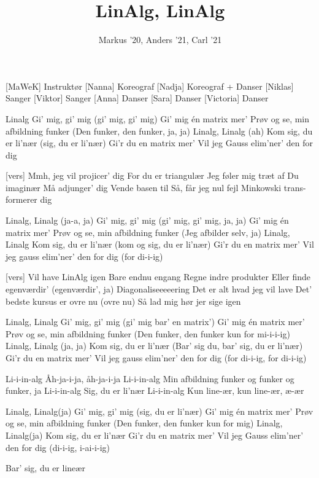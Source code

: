 \documentclass[a4paper,11pt]{article}
\title{LinAlg, LinAlg}
\author{Markus '20, Anders '21, Carl '21}
\begin{document}
\maketitle

\begin{roles}
[MaWeK] Instruktør
[Nanna] Koreograf
[Nadja] Koreograf + Danser
[Niklas] Sanger
[Viktor] Sanger
[Anna] Danser
[Sara] Danser
[Victoria] Danser
\end{roles}

\begin{props}
\end{props}


\begin{song}
 Linalg
Gi' mig, gi' mig (gi' mig, gi' mig)
Gi' mig én matrix mer'
Prøv og se, min afbildning funker
(Den funker, den funker, ja, ja)
Linalg, Linalg (ah)
Kom sig, du er li'nær (sig, du er li'nær)
Gi'r du en matrix mer'
Vil jeg Gauss elim'ner' den for dig

[vers] Mmh, jeg vil projicer' dig
For du er triangulær
Jeg føler mig træt af
Du imaginær
Må adjunger' dig
Vende basen til
Så, får jeg nul fejl
Minkowski trans-formerer dig

 Linalg, Linalg (ja-a, ja)
Gi' mig, gi' mig (gi' mig, gi' mig, ja, ja)
Gi' mig én matrix mer'
Prøv og se, min afbildning funker
(Jeg afbilder selv, ja)
Linalg, Linalg
Kom sig, du er li'nær (kom og sig, du er li'nær)
Gi'r du en matrix mer'
Vil jeg gauss elim'ner' den for dig (for di-i-ig)

[vers] Vil have LinAlg igen
Bare endnu engang
Regne indre produkter
Eller finde egenværdir' (egenværdir', ja)
Diagonaliseeeeering
Det er alt hvad jeg vil lave
Det' bedste kursus er ovre nu (ovre nu)
Så lad mig hør jer sige igen

 Linalg, Linalg
Gi' mig, gi' mig (gi' mig bar' en matrix')
Gi' mig én matrix mer'
Prøv og se, min afbildning funker
(Den funker, den funker kun for mi-i-i-ig)
Linalg, Linalg (ja, ja)
Kom sig, du er li'nær
(Bar' sig du, bar' sig, du er li'nær)
Gi'r du en matrix mer'
Vil jeg gauss elim'ner' den for dig (for di-i-ig, for di-i-ig)

 Li-i-in-alg
Åh-ja-i-ja, åh-ja-i-ja
Li-i-in-alg
Min afbildning funker og funker og funker, ja
Li-i-in-alg
Sig, du er li'nær
Li-i-in-alg
Kun line-ær, kun line-ær, æ-ær

 Linalg, Linalg(ja)
Gi' mig, gi' mig (sig, du er li'nær)
Gi' mig én matrix mer'
Prøv og se, min afbildning funker
(Den funker, den funker kun for mig)
Linalg, Linalg(ja)
Kom sig, du er li'nær
Gi'r du en matrix mer'
Vil jeg Gauss elim'ner' den for dig (di-i-ig, i-ai-i-ig)

Bar' sig, du er lineær
\end{song}
\end{document}
